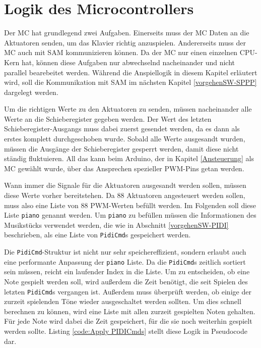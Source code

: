 \section{Logik des Microcontrollers} \label{vorgehenSW-MC}

Der \ac{MC} hat grundlegend zwei Aufgaben.
Einerseits muss der \ac{MC} Daten an die Aktuatoren senden, um das Klavier richtig anzuspielen.
Andererseits muss der \ac{MC} auch mit \ac{SAM} kommunizieren können.
Da der \ac{MC} nur einen einzelnen CPU-Kern hat, können diese Aufgaben nur abwechselnd nacheinander und nicht parallel bearebeitet werden.
Während die Anspiellogik in diesem Kapitel erläutert wird, soll die Kommunikation mit \ac{SAM} im nächsten Kapitel \ref{vorgehenSW-SPPP} dargelegt werden.

Um die richtigen Werte zu den Aktuatoren zu senden, müssen nacheinander alle Werte an die Schieberegister gegeben werden.
Der Wert des letzten Schieberegister-Ausgangs muss dabei zuerst gesendet werden, da es dann als erstes komplett durchgeschoben wurde.
Sobald alle Werte ausgesandt wurden, müssen die Ausgänge der Schieberegister gesperrt werden, damit diese nicht ständig fluktuieren.
All das kann beim Arduino, der in Kapitel \ref{Ansteuerung} als \ac{MC} gewählt wurde, über das Ansprechen spezieller \ac{PWM}-Pins getan werden.


Wann immer die Signale für die Aktuatoren ausgesandt werden sollen, müssen diese Werte vorher bereitstehen.
Da 88 Aktuatoren angesteuert werden sollen, muss also eine Liste von 88 \ac{PWM}-Werten befüllt werden.
Im Folgenden soll diese Liste \lstinline{piano} genannt werden.
Um \lstinline{piano} zu befüllen müssen die Informationen des Musikstücks verwendet werden, die wie in Abschnitt \ref{vorgehenSW-PIDI} beschrieben, als eine Liste von \lstinline{PidiCmd}s gespeichert werden.

Die \lstinline{PidiCmd}-Struktur ist nicht nur sehr speichereffizient, sondern erlaubt auch eine performante Anpassung der \lstinline{piano} Liste.
Da die \lstinline{PidiCmd}s zeitlich sortiert sein müssen, reicht ein laufender Index in die Liste.
Um zu entscheiden, ob eine Note gespielt werden soll, wird außerdem die Zeit benötigt, die seit Spielen des letzten \lstinline{PidiCmd}s vergangen ist.
Außerdem muss überprüft werden, ob einige der zurzeit spielenden Töne wieder ausgeschaltet werden sollten.
Um dies schnell berechnen zu können, wird eine Liste mit allen zurzeit gespielten Noten gehalten.
Für jede Note wird dabei die Zeit gespeichert, für die sie noch weiterhin gespielt werden sollte.
Listing \ref{code:Apply PIDICmds} stellt diese Logik in Pseudocode dar.

